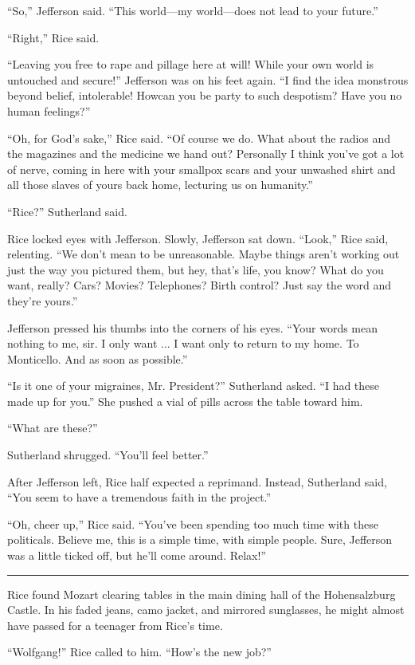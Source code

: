 ``So,'' Jefferson said. ``This world—my world—does not lead to your future.''

``Right,'' Rice said.

``Leaving you free to rape and pillage here at will! While your own world is untouched and secure!'' Jefferson was on his feet again. ``I find the idea monstrous beyond belief, intolerable! Howcan you be party to such despotism? Have you no human feelings?''

``Oh, for God's sake,'' Rice said. ``Of course we do. What about the radios and the magazines and the medicine we hand out? Personally I think you've got a lot of nerve, coming in here with your smallpox scars and your unwashed shirt and all those slaves of yours back home, lecturing us on humanity.''

``Rice?'' Sutherland said.

Rice locked eyes with Jefferson. Slowly, Jefferson sat down. ``Look,'' Rice said, relenting. ``We don't mean to be unreasonable. Maybe things aren't working out just the way you pictured them, but hey, that's life, you know? What do you want, really? Cars? Movies? Telephones? Birth control? Just say the word and they're yours.''

Jefferson pressed his thumbs into the corners of his eyes. ``Your words mean nothing to me, sir. I only want ... I want only to return to my home. To Monticello. And as soon as possible.''

``Is it one of your migraines, Mr. President?'' Sutherland asked. ``I had these made up for you.'' She pushed a vial of pills across the table toward him.

``What are these?''

Sutherland shrugged. ``You'll feel better.''

After Jefferson left, Rice half expected a reprimand. Instead, Sutherland said, ``You seem to have a tremendous faith in the project.''

``Oh, cheer up,'' Rice said. ``You've been spending too much time with these politicals. Believe me, this is a simple time, with simple people. Sure, Jefferson was a little ticked off, but he'll come around. Relax!''

\fancybreak{* * *}

Rice found Mozart clearing tables in the main dining hall of the Hohensalzburg Castle. In his faded jeans, camo jacket, and mirrored sunglasses, he might almost have passed for a teenager from Rice's time.

``Wolfgang!'' Rice called to him. ``How's the new job?''

